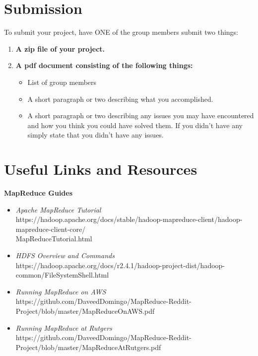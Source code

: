 \documentclass{article}
\begin{document}
\section*{Submission } 
To submit your project, have ONE of the group members submit two things:

\begin{enumerate}
\item \textbf{A zip file of your project.} 
\item \textbf{A pdf document consisting of the following things:}
	\begin{itemize}
	\item List of group members
	\item A short paragraph or two describing what you accomplished.
	\item A short paragraph or two describing any issues you may have encountered and how you think you could have solved them. If you didn't have any simply state that you didn't have any issues.
	\end{itemize}
\end{enumerate}




\section*{Useful Links and Resources} %
\textbf{MapReduce Guides}
\begin{itemize}
    \item \textit{Apache MapReduce Tutorial}\\ https://hadoop.apache.org/docs/stable/hadoop-mapreduce-client/hadoop-mapreduce-client-core/\\MapReduceTutorial.html
    \item \textit{HDFS Overview and Commands}\\ https://hadoop.apache.org/docs/r2.4.1/hadoop-project-dist/hadoop-common/FileSystemShell.html
    \item \textit{Running MapReduce on AWS}\\ https://github.com/DaveedDomingo/MapReduce-Reddit-Project/blob/master/MapReduceOnAWS.pdf
    \item \textit{Running MapReduce at Rutgers}\\ https://github.com/DaveedDomingo/MapReduce-Reddit-Project/blob/master/MapReduceAtRutgers.pdf
\end{itemize}
\end{document}
